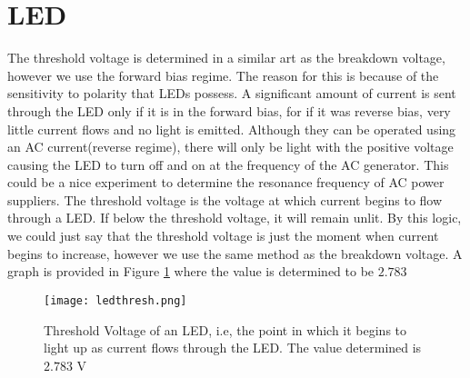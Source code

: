 \documentclass{article}
\begin{document}
\section{LED}\label{sec:led}
The threshold voltage is determined in a similar art as the breakdown voltage, however we use the forward bias regime.
The reason for this is because of the sensitivity to polarity that LEDs possess.
A significant amount of current is sent through the LED only if it is in the forward bias, for if it was reverse bias, very little current flows and no light is emitted.
Although they can be operated using an AC current(reverse regime), there will only be light with the positive voltage causing the LED to turn off and on at the frequency of the AC generator.
This could be a nice experiment to determine the resonance frequency of AC power suppliers.
The threshold voltage is the voltage at which current begins to flow through a LED.
If below the threshold voltage, it will remain unlit.
By this logic, we could just say that the threshold voltage is just the moment when current begins to increase, however we use the same method as the breakdown voltage.
A graph is provided in Figure \ref{fig:ledthresh} where the value is determined to be $2.783$

\begin{figure}
    \centering
    \texttt{[image: ledthresh.png]}
    \caption{Threshold Voltage of an LED, i.e, the point in which it begins to light up as current flows through the LED. The value determined is $2.783$ V}
    \label{fig:ledthresh}
\end{figure}
\end{document}
